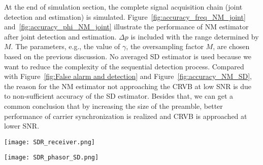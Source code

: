 At the end of simulation section, the complete signal acquisition chain (joint detection and estimation) is simulated.
Figure~\ref{fig:accuracy_freq_NM_joint} and~\ref{fig:accuracy_phi_NM_joint} illustrate the performance of NM estimator after joint detection and 
estimation. $\Delta p$ is included with the range determined by $M$.
The parameters, e.g., the value of $\gamma$, the oversampling factor $M$, are chosen based on the previous discussion.
No averaged SD estimator is used because we want to reduce the complexity of the sequential detection process.
Compared with Figure~\ref{fig:False alarm and detection} and Figure~\ref{fig:accuracy_NM_SD}, the reason for the NM estimator not approaching the CRVB at low SNR
is due to non-sufficient accuracy of the SD estimator. Besides that, we can get a common conclusion that by increasing
the size of the preamble, better performance of carrier synchronization is realized and CRVB is approached at lower SNR.

\begin{figure*}[t]
    \centerline{\texttt{[image: SDR\_receiver.png]}}
    \caption{Block diagram for implementing the proposed joint detection and estimation algorithm in Threading Building Blocks}
    \label{fig:SDR_receiver}
    \end{figure*}

\begin{figure*}[t]
    \centerline{\texttt{[image: SDR\_phasor\_SD.png]}}
    \caption{Block diagram for modified computation of phasor estimator (the middle level of dashed area in Figure~\ref{fig:SDR_receiver}) in Threading Building Blocks}
    \label{fig:SDR_phasor_SD}
    \end{figure*}